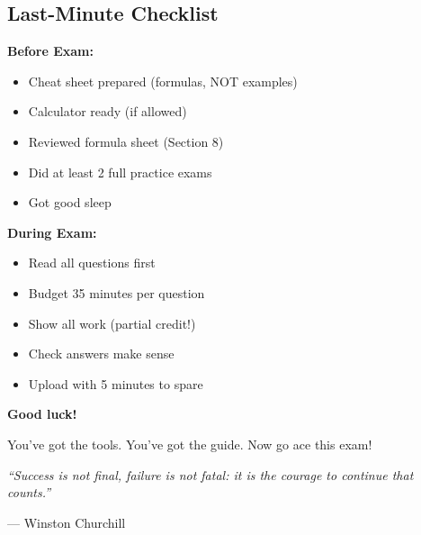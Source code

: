 \documentclass[10pt,letterpaper]{article}
\begin{document}
\subsection{Last-Minute Checklist}

\textbf{Before Exam:}
\begin{itemize}[label=$\square$]
  \item Cheat sheet prepared (formulas, NOT examples)
  \item Calculator ready (if allowed)
  \item Reviewed formula sheet (Section 8)
  \item Did at least 2 full practice exams
  \item Got good sleep
\end{itemize}

\textbf{During Exam:}
\begin{itemize}[label=$\square$]
  \item Read all questions first
  \item Budget 35 minutes per question
  \item Show all work (partial credit!)
  \item Check answers make sense
  \item Upload with 5 minutes to spare
\end{itemize}

\vfill

\begin{center}
\Large\textbf{Good luck!}

\vspace{0.5cm}

\normalsize
You've got the tools. You've got the guide. Now go ace this exam!

\vspace{1cm}

\textit{``Success is not final, failure is not fatal: it is the courage to continue that counts.''}

--- Winston Churchill
\end{center}
\end{document}
